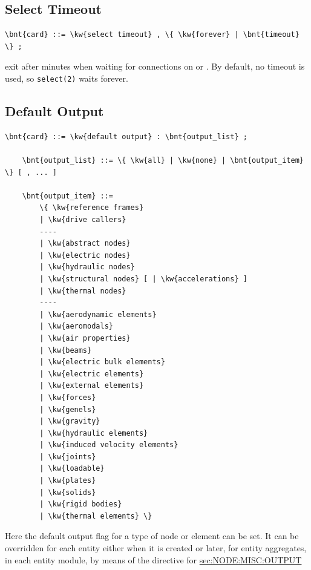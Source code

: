 \subsection{Select Timeout}
\begin{Verbatim}[commandchars=\\\{\}]
    \bnt{card} ::= \kw{select timeout} , \{ \kw{forever} | \bnt{timeout} \} ;
\end{Verbatim}
exit after  minutes when waiting for connections 
on  or .
By default, no timeout is used, so \texttt{select(2)} waits forever.

\subsection{Default Output}\label{sec:CONTROLDATA:DEFAULTOUTPUT}
\begin{Verbatim}[commandchars=\\\{\}]
    \bnt{card} ::= \kw{default output} : \bnt{output_list} ;

    \bnt{output_list} ::= \{ \kw{all} | \kw{none} | \bnt{output_item} \} [ , ... ]

    \bnt{output_item} ::=
        \{ \kw{reference frames}
        | \kw{drive callers}
        ----
        | \kw{abstract nodes}
        | \kw{electric nodes}
        | \kw{hydraulic nodes}
        | \kw{structural nodes} [ | \kw{accelerations} ]
        | \kw{thermal nodes}
        ----
        | \kw{aerodynamic elements}
        | \kw{aeromodals}
        | \kw{air properties}
        | \kw{beams}
        | \kw{electric bulk elements}
        | \kw{electric elements}
        | \kw{external elements}
        | \kw{forces}
        | \kw{genels}
        | \kw{gravity}
        | \kw{hydraulic elements}
        | \kw{induced velocity elements}
        | \kw{joints}
        | \kw{loadable}
        | \kw{plates}
        | \kw{solids}
        | \kw{rigid bodies}
        | \kw{thermal elements} \}
\end{Verbatim}
Here the default output flag for a type of node or element can be set.
It can be overridden for each entity either when it is created or later,
for entity aggregates, in each entity module, by means of the 
directive for 
\hyperref{\kw{nodes}}{\kw{nodes} (see Section~}{)}{sec:NODE:MISC:OUTPUT}
